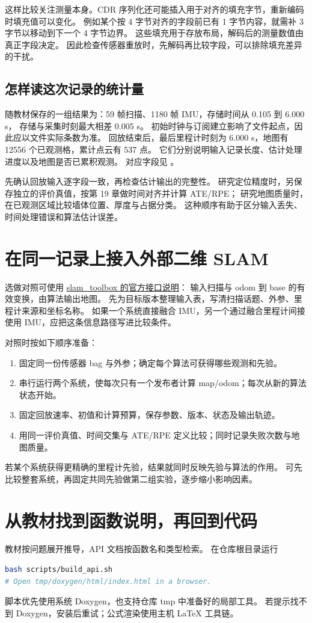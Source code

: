 这样比较关注测量本身。CDR 序列化还可能插入用于对齐的填充字节，重新编码时填充值可以变化。
例如某个按 4 字节对齐的字段前已有 1 字节内容，就需补 3 字节以移动到下一个 4 字节边界。
这些填充用于存放布局，解码后的测量数值由真正字段决定。
因此检查传感器重放时，先解码再比较字段，可以排除填充差异的干扰。

\subsection{怎样读这次记录的统计量}
随教材保存的一组结果为：59 帧扫描、1180 帧 IMU，存储时间从 0.105 到 6.000 s，
存储与采集时刻最大相差 0.005 s。
初始时钟与订阅建立影响了文件起点，因此应以文件实际条数为准。
回放结束后，最后里程计时刻为 6.000 s，地图有 12556 个已观测格，累计点云有 537 点。
它们分别说明输入记录长度、估计处理进度以及地图是否已累积观测。
对应字段见 。

先确认回放输入逐字段一致，再检查估计输出的完整性。
研究定位精度时，另保存独立的评价真值，按第 19 章做时间对齐并计算 ATE/RPE；
研究地图质量时，在已观测区域比较墙体位置、厚度与占据分类。
这种顺序有助于区分输入丢失、时间处理错误和算法估计误差。

\section{在同一记录上接入外部二维 SLAM}
选做对照可使用 \href{https://github.com/SteveMacenski/slam_toolbox#api}{slam\_toolbox 的官方接口说明}：
输入扫描与 odom 到 base 的有效变换，由算法输出地图。
先为目标版本整理输入表，写清扫描话题、外参、里程计来源和坐标名称。
如果一个系统直接融合 IMU，另一个通过融合里程计间接使用 IMU，应把这条信息路径写进比较条件。

对照时按如下顺序准备：
\begin{enumerate}
\item 固定同一份传感器 bag 与外参；确定每个算法可获得哪些观测和先验。
\item 串行运行两个系统，使每次只有一个发布者计算 map/odom；每次从新的算法状态开始。
\item 固定回放速率、初值和计算预算，保存参数、版本、状态及输出轨迹。
\item 用同一评价真值、时间交集与 ATE/RPE 定义比较；同时记录失败次数与地图质量。
\end{enumerate}
若某个系统获得更精确的里程计先验，结果就同时反映先验与算法的作用。
可先比较整套系统，再固定共同先验做第二组实验，逐步缩小影响因素。

\section{从教材找到函数说明，再回到代码}
教材按问题展开推导，API 文档按函数名和类型检索。
在仓库根目录运行
\begin{lstlisting}[language=bash,numbers=none]
bash scripts/build_api.sh
# Open tmp/doxygen/html/index.html in a browser.
\end{lstlisting}
脚本优先使用系统 Doxygen，也支持仓库 tmp 中准备好的局部工具。
若提示找不到 Doxygen，安装后重试；公式渲染使用主机 LaTeX 工具链。

